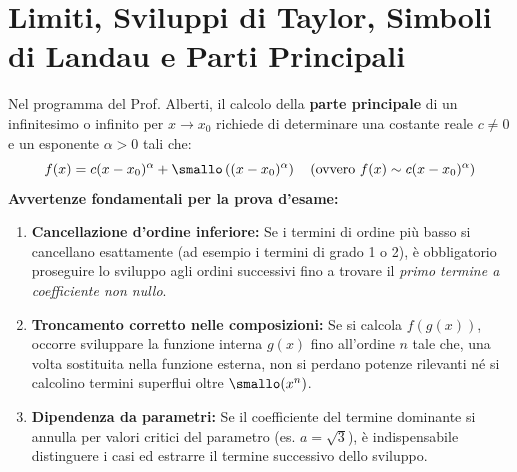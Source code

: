 \section{Limiti, Sviluppi di Taylor, Simboli di Landau e Parti Principali}
\label{sec:esami_limiti_taylor}

\begin{esame}
Nel programma del Prof. Alberti, il calcolo della \textbf{parte principale} di un infinitesimo o infinito per $x \to x_0$ richiede di determinare una costante reale $c \neq 0$ e un esponente $\alpha > 0$ tali che:
\[
    f(x) = c (x - x_0)^\alpha + \smallo\left((x - x_0)^\alpha\right) \quad (\text{ovvero } f(x) \sim c (x - x_0)^\alpha)
\]
\textbf{Avvertenze fondamentali per la prova d'esame:}
\begin{enumerate}
    \item \textbf{Cancellazione d'ordine inferiore:} Se i termini di ordine più basso si cancellano esattamente (ad esempio i termini di grado 1 o 2), è obbligatorio proseguire lo sviluppo agli ordini successivi fino a trovare il \emph{primo termine a coefficiente non nullo}.
    \item \textbf{Troncamento corretto nelle composizioni:} Se si calcola $f(g(x))$, occorre sviluppare la funzione interna $g(x)$ fino all'ordine $n$ tale che, una volta sostituita nella funzione esterna, non si perdano potenze rilevanti né si calcolino termini superflui oltre $\smallo(x^n)$.
    \item \textbf{Dipendenza da parametri:} Se il coefficiente del termine dominante si annulla per valori critici del parametro (es. $a = \sqrt{3}$), è indispensabile distinguere i casi ed estrarre il termine successivo dello sviluppo.
\end{enumerate}
\end{esame}

